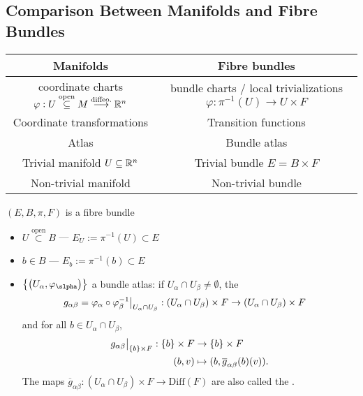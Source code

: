 \documentclass[main.tex]{subfiles}
\begin{document}
\subsection{Comparison Between Manifolds and Fibre Bundles}

\begin{center}
\begin{tabular}{|c|c|}
    \hline
   Manifolds  & Fibre bundles \\
   \hline
    coordinate charts $\varphi: U \overset{\text{open}}{\subseteq} M \overset{\text{diffeo.}}{\longrightarrow} \mathbb{R}^n$ & bundle charts / local trivializations $\varphi: \pi^{-1}(U) \to U \times F$ \\
    Coordinate transformations & Transition functions \\
    Atlas & Bundle atlas \\
    Trivial manifold $U \subseteq \mathbb{R}^n$ & Trivial bundle $E = B \times F$ \\
    Non-trivial manifold & Non-trivial bundle \\
    \hline
\end{tabular}
\end{center}

\begin{notation}
$(E,B, \pi, F)$ is a fibre bundle
\begin{itemize}
\item $U \overset{\text{open}}{\subset} B$ --- $E_U := \pi^{-1}(U) \subset E$
\item $b \in B$ --- $E_b := \pi^{-1}(b) \subset E$
\item $\brc{ \br{U_\alpha, \varphi_\slpha } }$ a bundle atlas: if $U_\alpha \cap U_\beta \neq\emptyset$, the 
\begin{align*}
    g_{\alpha\beta} = \varphi_\alpha \circ \varphi_\beta^{-1}\big|_{U_\alpha \cap U_\beta} : (U_\alpha \cap U_\beta) \times F &\to (U_\alpha \cap U_\beta) \times F
\end{align*}
and for all $b \in U_\alpha \cap U_\beta $,
\begin{align*}
    g_{\alpha\beta}\big|_{\left\{b\right\}\times F} : \left\{b\right\}\times F &\to \left\{b\right\}\times F \\
                                            (b, v) &\mapsto (b, \overline{g}_{\alpha\beta}(b)(v)).
\end{align*}
The maps $\overline{g}_{\alpha\beta}: (U_\alpha \cap U_\beta) \times F \to \text{Diff}(F)$ are also called the .
\end{itemize}
\end{notation}
\end{document}
